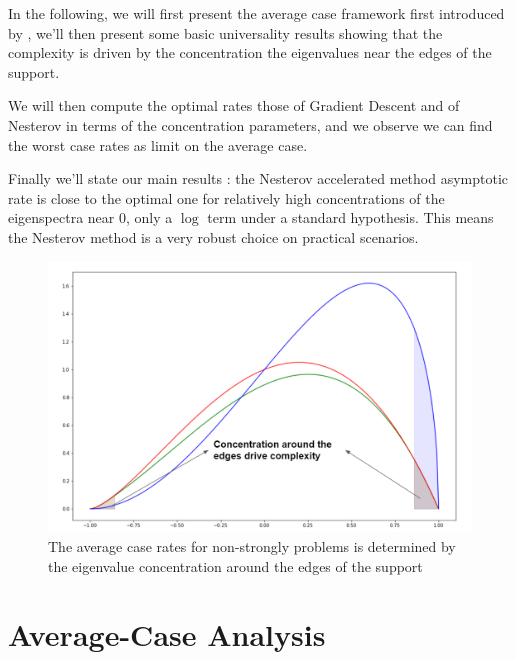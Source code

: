 \documentclass{article}
\begin{document}

In the following, we will first present the average case framework first introduced by \cite{pedregosa2020acceleration}, we'll then present some basic universality results showing that the complexity is driven by the concentration the eigenvalues near the edges of the support. 

We will then compute the optimal rates those  of Gradient Descent and of Nesterov in terms of the concentration parameters, and we observe we can find the worst case rates as limit on the average case. 

Finally we'll state our main results : the Nesterov accelerated method asymptotic rate is close to the optimal one for relatively high concentrations of the eigenspectra near $0$, only a $\log$ term under a standard hypothesis. This means the Nesterov method is a very robust choice on practical scenarios.


\begin{figure}[H]
    \centering
    \includegraphics[width=8 cm]{imgs/concentration.PNG}
    \caption{The average case rates for non-strongly problems is determined by the eigenvalue concentration around the edges of the support }
    \label{fig:my_label}
\end{figure}

\section{Average-Case Analysis} \label{sec:methods}
\end{document}
